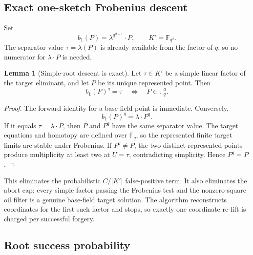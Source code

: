 \documentclass[11pt,a4paper]{article}
\theoremstyle{definition}
\newtheorem{lemma}[theorem]{Lemma}
\theoremstyle{remark}
\newcommand{\F}{\mathbb F}
\begin{document}
\subsection{Exact one-sketch Frobenius descent}\label{supp:sec:frob}

Set
\[
 b_1(P)=\lambda^{q^{d-1}}\!\cdot P,
 \qquad K'=\F_{q^d}.
\]
The separator value $\tau=\lambda(P)$ is already available from the factor of $\bar q$, so no numerator for $\lambda\cdot P$ is needed.

\begin{lemma}[Simple-root descent is exact]\label{supp:lem:exactfrob}
Let $\tau\in K'$ be a simple linear factor of the target eliminant, and let $P$ be its unique represented point.  Then
\[
 b_1(P)^q=\tau
 \quad\Longleftrightarrow\quad
 P\in\F_q^a.
\]
\end{lemma}

\begin{proof}
The forward identity for a base-field point is immediate.  Conversely,
\[
 b_1(P)^q
 =\lambda\cdot P^q.
\]
If it equals $\tau=\lambda\cdot P$, then $P$ and $P^q$ have the same separator value.  The target equations and homotopy are defined over $\F_q$, so the represented finite target limits are stable under Frobenius.  If $P^q\ne P$, the two distinct represented points produce multiplicity at least two at $U=\tau$, contradicting simplicity.  Hence $P^q=P$.
\end{proof}

This eliminates the probabilistic $C/|K'|$ false-positive term.  It also eliminates the abort cap: every simple factor passing the Frobenius test and the nonzero-square oil filter is a genuine base-field target solution.  The algorithm reconstructs coordinates for the first such factor and stops, so exactly one coordinate re-lift is charged per successful forgery.

\subsection{Root success probability}\label{supp:sec:rootbound}
\end{document}
